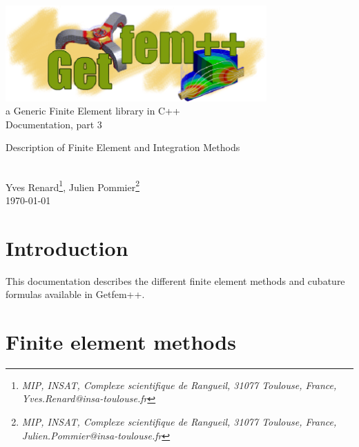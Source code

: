\documentclass[10pt,a4paper]{article}
\begin{document}
\begin{center}
  \includegraphics[width=10cm,angle=0]{getfem_logo.eps}\\[0.2cm]
  a Generic Finite Element library in C++ \\[0.5cm]
  {\LARGE Documentation, part \Huge 3} \\[0.5cm]
  \begin{largebox} \begin{center}
      \Huge \sc Description of Finite Element and Integration Methods
  \end{center}  \end{largebox}
  \\[0.5cm]
  { \large Yves \sc Renard\footnote{ \it MIP, INSAT, Complexe scientifique de Rangueil, 31077 Toulouse, France, Yves.Renard@insa-toulouse.fr }, Julien Pommier\footnote{ \it MIP, INSAT, Complexe scientifique de Rangueil, 31077 Toulouse, France, Julien.Pommier@insa-toulouse.fr } } \\[1.0cm]
      \today \\[1.0cm]
\end{center}




\section*{Introduction}
This documentation describes the different finite element methods and cubature formulas available in {\sc Getfem++}.\\[5cm]


\newpage
\tableofcontents
\newpage

\section{Finite element methods}
\end{document}
